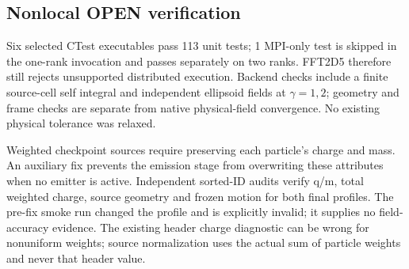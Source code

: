 \subsection{Nonlocal OPEN verification}
Six selected CTest executables pass 113 unit tests; 1 MPI-only test
is skipped in the one-rank invocation and passes separately on two ranks.
FFT2D5 therefore still rejects unsupported distributed execution. Backend
checks include a finite source-cell self integral and independent ellipsoid
fields at $\gamma=1,2$; geometry and frame checks are separate from native
physical-field convergence. No existing physical tolerance was relaxed.

Weighted checkpoint sources require preserving each particle's charge and
mass. An auxiliary fix prevents the emission stage from overwriting these
attributes when no emitter is active. Independent sorted-ID audits verify
q/m, total weighted charge, source geometry and frozen motion for both final
profiles. The pre-fix smoke run changed the profile and is explicitly invalid;
it supplies no field-accuracy evidence. The existing header charge diagnostic
can be wrong for nonuniform weights; source normalization uses the actual
sum of particle weights and never that header value.
